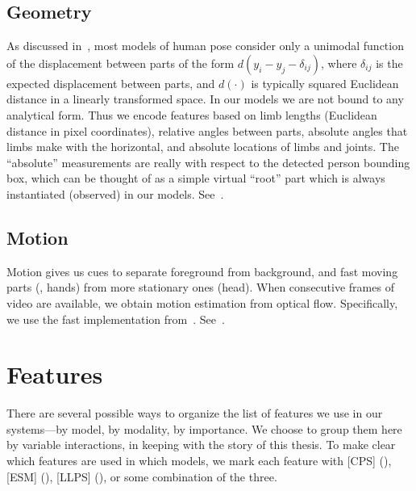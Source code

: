\section{Geometry}\label{sec:geom}
As discussed in~, most models of human pose consider only a unimodal 
function of the displacement between parts of the form $d(y_i - y_j - 
\delta_{ij})$, where $\delta_{ij}$ is the expected displacement between parts, 
and $d(\cdot)$ is typically squared Euclidean distance in a linearly 
transformed space.  In our models we are not bound to any analytical form.  
Thus we encode features based on limb lengths (Euclidean distance in pixel 
coordinates), relative angles between parts, absolute angles that limbs make 
with the horizontal, and absolute locations of limbs and joints.  The 
``absolute'' measurements are really with respect to the detected person 
bounding box, which can be thought of as a simple virtual ``root'' part which 
is always instantiated (observed) in our models.  
See~.

\section{Motion}\label{sec:motion} Motion gives us cues to separate foreground 
from background, and fast moving parts (\eg, hands) from more stationary ones 
(\eg head).  When consecutive frames of video are available, we obtain motion 
estimation from optical flow.  Specifically, we use the fast implementation 
from~\citet{liu-optflow}.  See~.




\chapter{Features}

There are several possible ways to organize the list of features we use in our 
systems---by model, by modality, by importance.  We choose to group them 
here by variable interactions, in keeping with the story of this thesis.  To 
make clear which features are used in which models, we mark each feature with 
[CPS] (), [ESM] (), [LLPS] (), or 
some combination of the three.

